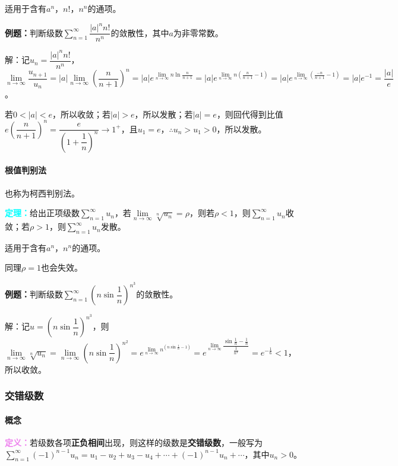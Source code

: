 \documentclass[UTF8, 12pt]{ctexart}
\begin{document}
适用于含有$a^n$，$n!$，$n^n$的通项。

\textbf{例题：}判断级数$\sum\limits_{n=1}^\infty\dfrac{\vert a\vert^nn!}{n^n}$的敛散性，其中$a$为非零常数。

解：记$u_n=\dfrac{\vert a\vert^nn!}{n^n}$，$\lim\limits_{n\to\infty}\dfrac{u_{n+1}}{u_n}=\vert a\vert\lim\limits_{n\to\infty}\left(\dfrac{n}{n+1}\right)^n=\vert a\vert e^{\lim\limits_{n\to\infty}n\ln\frac{n}{n+1}}=\vert a\vert e^{\lim\limits_{n\to\infty}n(\frac{n}{n+1}-1)}=\vert a\vert e^{\lim\limits_{n\to\infty}(\frac{-n}{n+1}-1)}=\vert a\vert e^{-1}=\dfrac{\vert a\vert}{e}$。

若$0<\vert a\vert<e$，所以收敛；若$\vert a\vert>e$，所以发散；若$\vert a\vert=e$，则回代得到比值$e\left(\dfrac{n}{n+1}\right)^n=\dfrac{e}{(1+\dfrac{1}{n})^n}\to1^+$，且$u_1=e$，$\therefore u_n>u_1>0$，所以发散。

\paragraph{根值判别法} \leavevmode \medskip

也称为柯西判别法。

\textcolor{aqua}{\textbf{定理：}}给出正项级数$\sum\limits_{n=1}^\infty u_n$，若$\lim\limits_{n\to\infty}\sqrt[n]{u_n}=\rho$，则若$\rho<1$，则$\sum\limits_{n=1}^\infty u_n$收敛；若$\rho>1$，则$\sum\limits_{n=1}^\infty u_n$发散。

适用于含有$a^n$，$n^n$的通项。

同理$\rho=1$也会失效。

\textbf{例题：}判断级数$\sum\limits_{n=1}^\infty\left(n\sin\dfrac{1}{n}\right)^{n^3}$的敛散性。

解：记$u=\left(n\sin\dfrac{1}{n}\right)^{n^3}$，则$\lim\limits_{n\to\infty}\sqrt[n]{u_n}=\lim\limits_{n\to\infty}\left(n\sin\dfrac{1}{n}\right)^{n^2}=e^{\lim\limits_{n\to\infty}n^(n\sin\frac{1}{n}-1)}=e^{\lim\limits_{n\to\infty}\dfrac{\sin\frac{1}{n}-\frac{1}{n}}{\frac{1}{n^3}}}=e^{-\frac{1}{6}}<1$，所以收敛。

\subsubsection{交错级数}

\paragraph{概念} \leavevmode \medskip

\textcolor{violet}{\textbf{定义：}}若级数各项\textbf{正负相间}出现，则这样的级数是\textbf{交错级数}，一般写为$\sum\limits_{n=1}^\infty(-1)^{n-1}u_n=u_1-u_2+u_3-u_4+\cdots+(-1)^{n-1}u_n+\cdots$，其中$u_n>0$。
\end{document}
